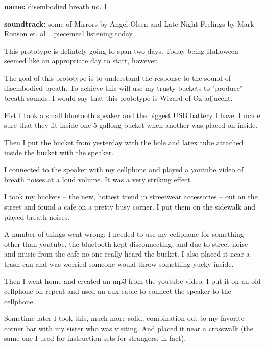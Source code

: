 \documentclass[11pt]{report}
\begin{document}
\begin{itmemize}
\textbf{name:} disembodied breath no. 1

\textbf{soundtrack:} some of Mirrors by Angel Olsen and Late Night Feelings by Mark Ronson et. al ...piecemeal listening today

This prototype is defintely going to span two days. Today being Halloween seemed like an appropriate day to start, however.

The goal of this prototype is to understand the response to the sound of disembodied breath. To achieve this will use my trusty buckets to "produce" breath sounds. I would say that this prototype is Wizard of Oz adjacent.

Fist I took a small bluetooth speaker and the biggest USB battery I have. I made sure that they fit inside one 5 gallong bucket when another was placed on inside. 

Then I put the bucket from yesterday with the hole and latex tube attached inside the bucket with the speaker. 

I connected to the speaker with my cellphone and played a youtube video of breath noises at a loud volume. It was a very striking effect.

I took my buckets -- the new, hottest trend in streetwear accessories -- out on the street and found a cafe on a pretty busy corner. I put them on the sidewalk and played breath noises.

A number of things went wrong; I needed to use my cellphone for something other than youtube, the bluetooth kept disconnecting, and due to street noise and music from the cafe no one really heard the bucket. I also placed it near a trash can and was worried someone would throw something yucky inside.

Then I went home and created an mp3 from the youtube video. I put it on an old cellphone on repeat and used an aux cable to connect the speaker to the cellphone. 

Sometime later I took this, much more solid, combination out to my favorite corner bar with my sister who was visiting. And placed it near a crosswalk (the same one I used for instruction sets for strangers, in fact).


\end{itmemize}
\end{document}
